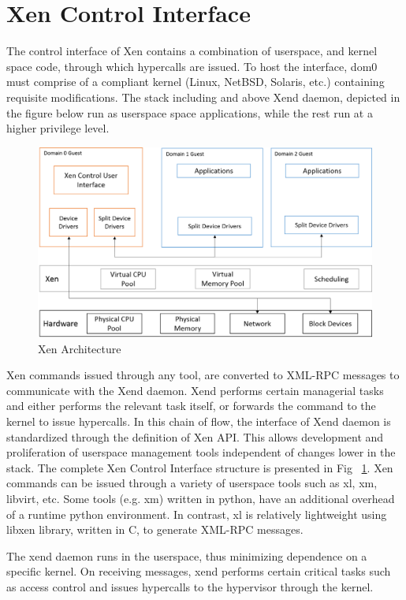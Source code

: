 \section{Xen Control Interface}
The control interface of Xen contains a combination of userspace, and kernel space code, through which hypercalls are issued. To host the interface, dom0 must comprise of a compliant kernel (Linux, NetBSD, Solaris, etc.) containing requisite modifications. The stack including and above Xend daemon, depicted in the figure below run as userspace space applications, while the rest run at a higher privilege level. 


\begin{figure}
\centering
\includegraphics[scale=0.6]{figures/Xen_model.png}
\caption{Xen Architecture}
\label{fig:xen_api}
\end{figure}

Xen commands issued through any tool, are converted to XML-RPC messages to communicate with the Xend daemon. Xend performs certain managerial tasks and either performs the relevant task itself, or forwards the command to the kernel to issue hypercalls. In this chain of flow, the interface of Xend daemon is standardized through the definition of Xen API. This allows development and proliferation of userspace management tools independent of changes lower in the stack. The complete Xen Control Interface structure is presented in Fig ~\ref{fig:xen_api}. Xen commands can be issued through a variety of userspace tools such as xl, xm, libvirt, etc. Some tools (e.g. xm) written in python, have an additional overhead of a runtime python environment. In contrast, xl is relatively lightweight using libxen library, written in C, to generate XML-RPC messages. 

The xend daemon runs in the userspace, thus minimizing dependence on a specific kernel. On receiving messages, xend performs certain critical tasks such as access control and issues hypercalls to the hypervisor through the kernel. 

